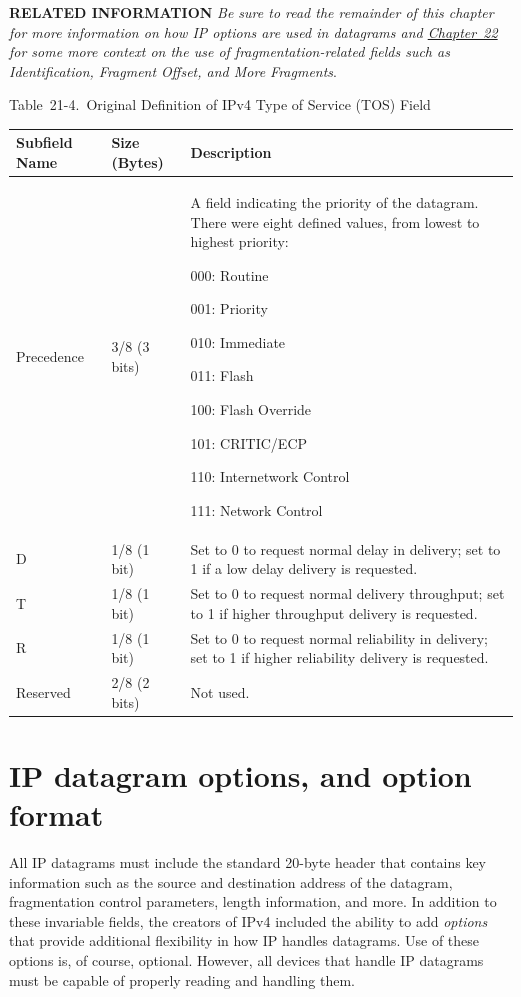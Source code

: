 {\textbf{RELATED INFORMATION}} {\emph{Be sure to read the remainder of
this chapter for more information on how IP options are used in
datagrams and \protect\hyperlink{ch22.html}{Chapter~22} for some more
context on the use of fragmentation-related fields such as
Identification, Fragment Offset, and More Fragments}}.



Table~21-4.~Original Definition of IPv4 Type of Service (TOS) Field

\begin{longtable}[]{@{}lll@{}}
\toprule
Subfield Name & Size (Bytes) & Description\tabularnewline
\midrule
\endhead
\begin{minipage}[t]{0.30\columnwidth}\raggedright
Precedence\strut
\end{minipage} & \begin{minipage}[t]{0.30\columnwidth}\raggedright
3/8 (3 bits)\strut
\end{minipage} & \begin{minipage}[t]{0.30\columnwidth}\raggedright
A field indicating the priority of the datagram. There were eight
defined values, from lowest to highest priority:

000: Routine

001: Priority

010: Immediate

011: Flash

100: Flash Override

101: CRITIC/ECP

110: Internetwork Control

111: Network Control\strut
\end{minipage}\tabularnewline
D & 1/8 (1 bit) & Set to 0 to request normal delay in delivery; set to 1
if a low delay delivery is requested.\tabularnewline
T & 1/8 (1 bit) & Set to 0 to request normal delivery throughput; set to
1 if higher throughput delivery is requested.\tabularnewline
R & 1/8 (1 bit) & Set to 0 to request normal reliability in delivery;
set to 1 if higher reliability delivery is requested.\tabularnewline
Reserved & 2/8 (2 bits) & Not used.\tabularnewline
\bottomrule
\end{longtable}


\section{IP datagram options, and option format}


All IP datagrams must include the standard 20-byte header that contains key
information such as the source and destination address of the datagram,
fragmentation control parameters, length information, and more. In
addition to these invariable fields, the creators of IPv4 included the
ability to add \emph{options} that provide additional flexibility in
how IP handles datagrams. Use of these options is, of course, optional.
However, all devices that handle IP datagrams must be capable of
properly reading and handling them.

